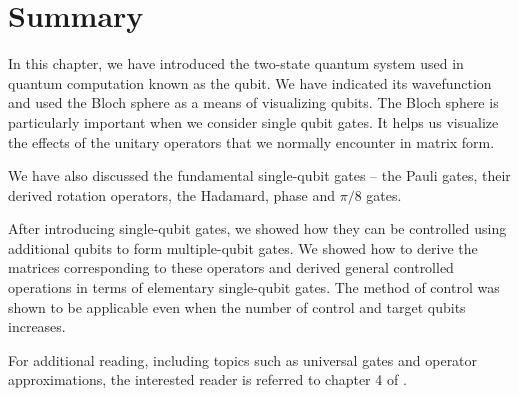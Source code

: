 \section{Summary}

In this chapter, we have introduced the two-state quantum system used in quantum computation known as the qubit. We have indicated its wavefunction and used the Bloch sphere as a means of visualizing qubits. The Bloch sphere is particularly important when we consider single qubit gates. It helps us visualize the effects of the unitary operators that we normally encounter in matrix form.

We have also discussed the fundamental single-qubit gates -- the Pauli gates, their derived rotation operators, the Hadamard, phase and $\pi/8$ gates.

After introducing single-qubit gates, we showed how they can be controlled using additional qubits to form multiple-qubit gates. We showed how to derive the matrices corresponding to these operators and derived general controlled operations in terms of elementary single-qubit gates. The method of control was shown to be applicable even when the number of control and target qubits increases.

For additional reading, including topics such as universal gates and operator approximations, the interested reader is referred to chapter 4 of \cite{nielsen2000}.
